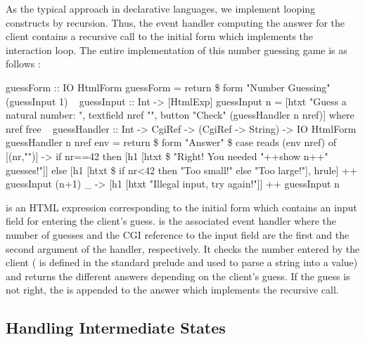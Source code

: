 As the typical approach in declarative languages,
we implement looping constructs by recursion.
Thus, the event handler computing the answer for the client
contains a recursive call to the initial form
which implements the interaction loop.
The entire implementation of this number guessing game
is as follows :
%
\begin{prog}
guessForm :: IO HtmlForm
guessForm = return \$ form "Number Guessing" (guessInput 1)
~
guessInput :: Int -> [HtmlExp]
guessInput n =
  [htxt "Guess a natural number: ", textfield nref "",
   button "Check" (guessHandler n nref)]   where nref free
~
guessHandler :: Int -> CgiRef -> (CgiRef -> String) -> IO HtmlForm
guessHandler n nref env =
  return \$ form "Answer" \$
    case reads (env nref) of
      [(nr,"")] ->
            if nr==42
              then [h1 [htxt \$ "Right! You needed "++show n++" guesses!"]]
              else [h1 [htxt \$ if nr<42 then "Too small!"
                                        else "Too large!"],
                    hrule] ++ guessInput (n+1)
      _ -> [h1 [htxt "Illegal input, try again!"]] ++ guessInput n
\end{prog}
%
 is an HTML expression corresponding to
the initial form which contains an
input field for entering the client's guess.
 is the associated event handler where the
number of guesses and the
CGI reference to the input field are the first and the second argument
of the handler, respectively.
It checks the number entered by the client
( is defined in the standard prelude
and used to parse a string into a value)
and returns the different answers depending on the client's guess.
If the guess is not right, the  is appended
to the answer which implements the recursive call.


\subsection{Handling Intermediate States}
\label{sec-intermediate-state}

